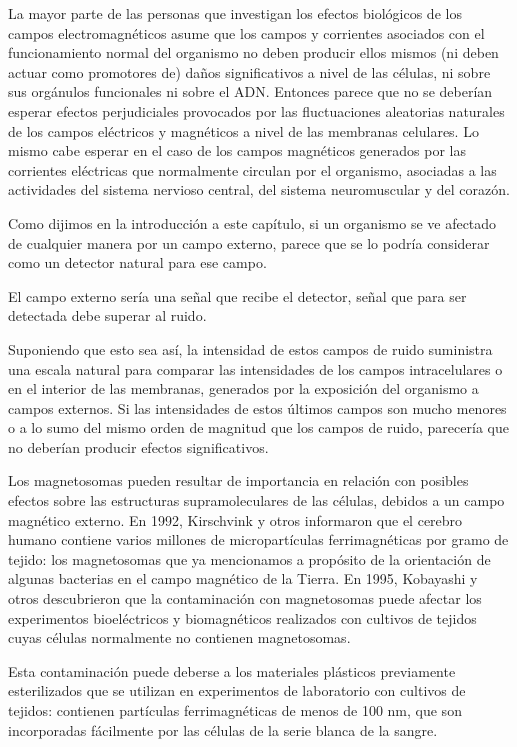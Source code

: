 La mayor parte de las personas que investigan los efectos biológicos de los campos electromagnéticos asume que los campos y corrientes asociados con el funcionamiento normal del organismo no deben producir ellos mismos (ni deben actuar como promotores de) daños significativos a nivel de las células, ni sobre sus orgánulos funcionales ni sobre el ADN.
Entonces parece que no se deberían esperar efectos perjudiciales provocados por las fluctuaciones aleatorias naturales de los campos eléctricos y magnéticos a nivel de las membranas celulares.
Lo mismo cabe esperar en el caso de los campos magnéticos generados por las corrientes eléctricas que normalmente circulan por el organismo, asociadas a las actividades del sistema nervioso central, del sistema neuromuscular y del corazón.

Como dijimos en la introducción a este capítulo, si un organismo se ve afectado de cualquier manera por un campo externo, parece que se lo podría considerar como un detector natural para ese campo.

El campo externo sería una señal que recibe el detector, señal que para ser detectada debe superar al ruido.

Suponiendo que esto sea así, la intensidad de estos campos de ruido suministra una escala natural para comparar las intensidades de los campos intracelulares o en el interior de las membranas, generados por la exposición del organismo a campos externos.
Si las intensidades de estos últimos campos son mucho menores o a lo sumo del mismo orden de magnitud que los campos de ruido, parecería que no deberían producir efectos significativos.

Los magnetosomas pueden resultar de importancia en relación con posibles efectos sobre las estructuras supramoleculares de las células, debidos a un campo magnético externo.
En 1992, Kirschvink y otros informaron que el cerebro humano contiene varios millones de micropartículas ferrimagnéticas por gramo de tejido: los magnetosomas que ya mencionamos a propósito de la orientación de algunas bacterias en el campo magnético de la Tierra.
En 1995, Kobayashi y otros descubrieron que la contaminación con magnetosomas puede afectar los experimentos bioeléctricos y biomagnéticos realizados con cultivos de tejidos cuyas células normalmente no contienen magnetosomas.

Esta contaminación puede deberse a los materiales plásticos previamente esterilizados que se utilizan en experimentos de laboratorio con cultivos de tejidos: contienen partículas ferrimagnéticas de menos de 100 nm, que son incorporadas fácilmente por las células de la serie blanca de la sangre.

